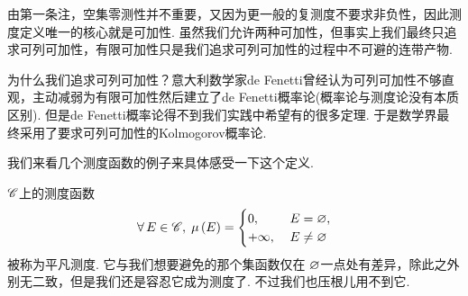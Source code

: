 \begin{remark}
    由第一条注，空集零测性并不重要，又因为更一般的复测度不要求非负性，因此测度定义唯一的核心就是可加性. 虽然我们允许两种可加性，但事实上我们最终只追求可列可加性，有限可加性只是我们追求可列可加性的过程中不可避的连带产物. 

    为什么我们追求可列可加性？意大利数学家de Fenetti曾经认为可列可加性不够直观，主动减弱为有限可加性然后建立了de Fenetti概率论(概率论与测度论没有本质区别). 但是de Fenetti概率论得不到我们实践中希望有的很多定理. 于是数学界最终采用了要求可列可加性的{\selectfont Kolmogorov}概率论.
\end{remark}
\vspace{0.5cm}

我们来看几个测度函数的例子来具体感受一下这个定义.
\begin{example}
    $\mathscr{C}$上的测度函数
    \[   \forall\,E\in\mathscr{C},\; \mu\left(E\right)= \begin{cases}
        0,\;  &E=\varnothing , \\
        +\infty ,\;  &E\neq\varnothing 
    \end{cases}   \]
    被称为平凡测度. 它与我们想要避免的那个集函数仅在 $\varnothing$一点处有差异，除此之外别无二致，但是我们还是容忍它成为测度了. 不过我们也压根儿用不到它.
\end{example}

